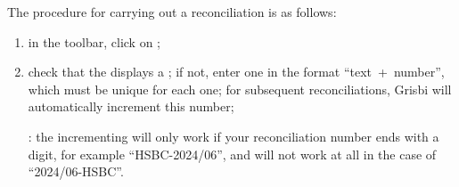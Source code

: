 The procedure for carrying out a reconciliation is as follows:
\begin{enumerate}
	\item in the toolbar, click on ;
	\item check that the  displays a ; if not, enter one in the format \enquote{text~+~number}, which must be unique for each one; for subsequent reconciliations, Grisbi will automatically increment this number;
	
	\Note{}: the incrementing will only work if your reconciliation number ends with a digit, for example \enquote{HSBC-2024/06}, and will not work at all in the case of \enquote{2024/06-HSBC}.
	

\end{enumerate}
